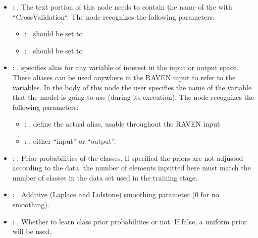 \begin{itemize}
\begin{itemize}
        \item {}: ,
          List of IDs of features/variables to include in the transformation process.

        \item {}: ,
          Which space to search? Target or Feature?
      \end{itemize}

    \item {}: ,
      The text portion of this node needs to contain the name of the  with
               ``CrossValidation``.
      The  node recognizes the following parameters:
        \begin{itemize}
          \item {}: ,
            should be set to 
          \item {}: ,
            should be set to 
      \end{itemize}

    \item {}: ,
      specifies alias for         any variable of interest in the input or output space. These
      aliases can be used anywhere in the RAVEN input to         refer to the variables. In the body
      of this node the user specifies the name of the variable that the model is going to use
      (during its execution).
      The  node recognizes the following parameters:
        \begin{itemize}
          \item {}: ,
            define the actual alias, usable throughout the RAVEN input
          \item {}: ,
            either ``input'' or ``output''.
      \end{itemize}

    \item {}: ,
      Prior probabilities of the classes. If specified the priors are
      not adjusted according to the data. \nb the number of elements inputted here must
      match the number of classes in the data set used in the training stage.

    \item {}: ,
      Additive (Laplace and Lidstone) smoothing parameter (0 for no smoothing).

    \item {}: ,
      Whether to learn class prior probabilities or not. If false, a uniform
      prior will be used.
  \end{itemize}


